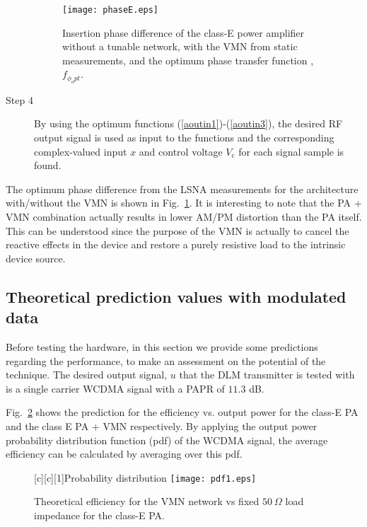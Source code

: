 \documentclass[10pt,journal]{IEEEtran}
\begin{document}
\begin{description}
    \begin{figure}
    \centering
    \texttt{[image: phaseE.eps]}
    \caption{Insertion phase difference of the class-E power amplifier without
    a tunable network, with the VMN from static measurements, and the optimum phase transfer function , $f_{\phi_opt}$.} \label{phaseE}
    \end{figure}

\item[Step 4] By using the optimum functions (\ref{aoutin1})-(\ref{aoutin3}), the desired RF output signal is used as input to the functions and the corresponding complex-valued input $x$ and control voltage $V_\text{c}$ for each signal sample is found.
\end{description}

The optimum phase difference from the LSNA measurements for the architecture with/without the VMN is shown in Fig.~\ref{phaseE}. It is interesting to note that the PA + VMN combination actually results in lower AM/PM distortion than the PA itself. This can be understood since the purpose of the VMN is actually to cancel the reactive effects in the device and restore a purely resistive load to the intrinsic device source.

\subsection{Theoretical prediction values with modulated data}

Before testing the hardware, in this section we provide some predictions regarding the performance, to make an assessment on the potential of the technique. The desired output signal, $u$ that the DLM transmitter is tested with is a single carrier WCDMA signal with a PAPR of $11.3$ dB.

Fig.~\ref{pdfE} shows the prediction for the efficiency vs. output power for the class-E PA and the class E PA + VMN respectively. By applying the output power probability distribution function (pdf) of the WCDMA signal, the average efficiency can be calculated by averaging over this pdf.

\begin{figure}
\centering
{}[c][c][1]{Probability distribution}
\texttt{[image: pdf1.eps]}
\caption{Theoretical efficiency for the VMN network vs fixed $50~
\Omega$ load impedance for the class-E PA.} \label{pdfE}
\end{figure}
\end{document}
